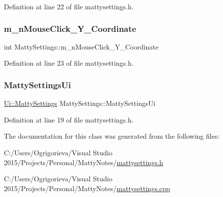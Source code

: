 Definition at line 22 of file mattysettings.\+h.

\hypertarget{classMattySettings_a622b01c6b81a35e28b414079eaff132e}{}\label{classMattySettings_a622b01c6b81a35e28b414079eaff132e} 
\subsubsection{\texorpdfstring{m\+\_\+n\+Mouse\+Click\+\_\+\+Y\+\_\+\+Coordinate}{m\_nMouseClick\_Y\_Coordinate}}
{\footnotesize\ttfamily int Matty\+Settings\+::m\+\_\+n\+Mouse\+Click\+\_\+\+Y\+\_\+\+Coordinate\hspace{0.3cm}{\ttfamily [private]}}



Definition at line 23 of file mattysettings.\+h.

\hypertarget{classMattySettings_a6974b17b34c30385f6b503f40b460ea1}{}\label{classMattySettings_a6974b17b34c30385f6b503f40b460ea1} 
\subsubsection{\texorpdfstring{Matty\+Settings\+Ui}{MattySettingsUi}}
{\footnotesize\ttfamily \hyperlink{classUi_1_1MattySettings}{Ui\+::\+Matty\+Settings} Matty\+Settings\+::\+Matty\+Settings\+Ui\hspace{0.3cm}{\ttfamily [private]}}



Definition at line 19 of file mattysettings.\+h.



The documentation for this class was generated from the following files\+:\begin{DoxyCompactItemize}
\item 
C\+:/\+Users/\+Ogrigorieva/\+Visual Studio 2015/\+Projects/\+Personal/\+Matty\+Notes/\hyperlink{mattysettings_8h}{mattysettings.\+h}\item 
C\+:/\+Users/\+Ogrigorieva/\+Visual Studio 2015/\+Projects/\+Personal/\+Matty\+Notes/\hyperlink{mattysettings_8cpp}{mattysettings.\+cpp}\end{DoxyCompactItemize}
